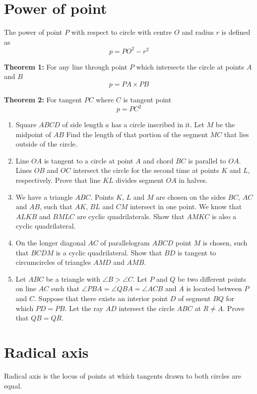 \documentclass{article}
\begin{document}
\section{Power of point}
The power of point $P$ with respect to circle with centre $O$ and radius $r$ is defined as
$$ p= PO^2-r^2 $$

\textbf{Theorem 1: } 
For any line through point $P$ which intersects the circle at points $A$ and $B$ 
$$p= PA \times PB$$

\textbf{Theorem 2: }
For tangent $PC$ where $C$ is tangent point
$$p=PC^2$$  

\begin{enumerate}
\item 
Square $ABCD$ of side length $a$ has a circle inscribed in it. Let $M$ be the midpoint of $AB$ Find the length of that portion of the segment $MC$ that lies outside of the circle.

\item  %
Line $OA$ is tangent to a circle at point $A$ and chord $BC$ is parallel to $OA$. Lines	$OB$ and $OC$ intersect the circle for the second time at points $K$ and $L$, respectively. Prove
that line $KL$ divides segment $OA$ in halves.

\item %
We have a triangle $ABC$. Points $K$, $L$ and $M$ are chosen on the sides $BC$, $AC$ and $AB$, such that $AK$, $BL$ and $CM$ intersect in one point. We know that $ALKB$ and $BMLC$ are cyclic quadrilaterals. Show that $AMKC$ is also a cyclic quadrilateral.

\item %
On the longer diagonal $AC$ of parallelogram $ABCD$ point $M$ is chosen, such that $BCDM$ is a cyclic quadrilateral. Show that $BD$ is tangent to circumcircles of triangles $AMD$ and $AMB$.

\item %
Let $ABC$ be a triangle with $\angle B > \angle C$. Let $P$ and $Q$ be two different points on line $AC$ such that $\angle PBA = \angle QBA = \angle ACB$ and $A$ is located between $P$ and $C$. Suppose that there exists an interior point $D$ of segment $BQ$ for which $PD=PB$. Let the ray $AD$ intersect the circle $ABC$ at $R \ne A$. Prove that $QB = QR$.
\end{enumerate}


\newpage
\section{Radical axis}
Radical axis is the locus of points at which tangents drawn to both circles are equal.
\end{document}
